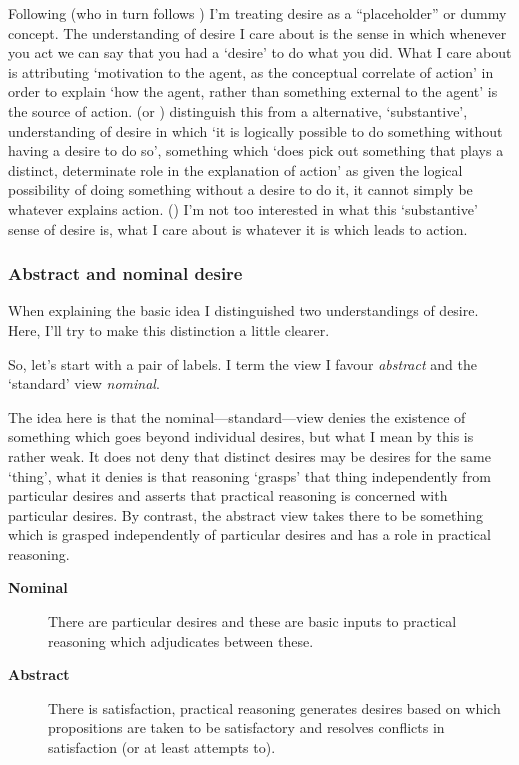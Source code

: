 \documentclass[10pt]{article}
\begin{document}
Following \textcite{Schapiro:2014aa} (who in turn follows \textcite{Schueler:1995aa}) I'm treating desire as a ``placeholder'' or dummy concept.
The understanding of desire I care about is the sense in which whenever you act we can say that you had a `desire' to do what you did.
What I care about is attributing `motivation to the agent, as the conceptual correlate of action' in order to explain `how the agent, rather than something external to the agent' is the source of action.
\citeauthor{Schapiro:2014aa} (or \citeauthor{Schueler:1995aa}) distinguish this from a alternative, `substantive', understanding of desire in which `it is logically possible to do something without having a desire to do so', something which `does pick out something that plays a distinct, determinate role in the explanation of action' as given the logical possibility of doing something without a desire to do it, it cannot simply be whatever explains action. (\citeyear[136--137]{Schapiro:2014aa})
I'm not too interested in what this `substantive' sense of desire is, what I care about is whatever it is which leads to action.


\subsubsection{Abstract and nominal desire}
\label{sec:abstr-nomin-desire}

When explaining the basic idea I distinguished two understandings of desire.
Here, I'll try to make this distinction a little clearer.

So, let's start with a pair of labels.
I term the view I favour \emph{abstract} and the `standard' view \emph{nominal}.

The idea here is that the nominal---standard---view denies the existence of something which goes beyond individual desires, but what I mean by this is rather weak.
It does not deny that distinct desires may be desires for the same `thing', what it denies is that reasoning `grasps' that thing independently from particular desires and asserts that practical reasoning is concerned with particular desires.
By contrast, the abstract view takes there to be something which is grasped independently of particular desires and has a role in practical reasoning.

\begin{description}
\item[\textbf{Nominal}] There are particular desires and these are basic inputs to practical reasoning which adjudicates between these.
\item[\textbf{Abstract}] There is satisfaction, practical reasoning generates desires based on which propositions are taken to be satisfactory and resolves conflicts in satisfaction (or at least attempts to).
\end{description}
\end{document}
